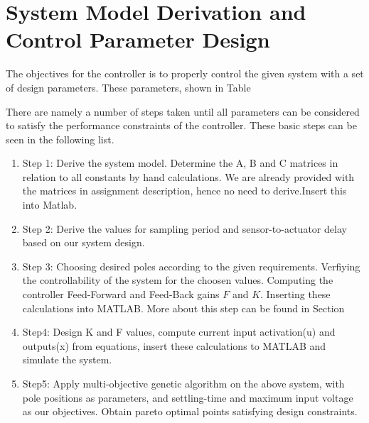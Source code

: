 \section{System Model Derivation and Control Parameter Design}
The objectives for the controller is to properly control the given system with a set of design parameters. These parameters, shown in Table %

There are namely a number of steps taken until all parameters can be considered to satisfy the performance constraints of the controller. These basic steps can be seen in the following list.

\begin{enumerate}
	\item Step 1: Derive the system model. Determine the A, B and C matrices in relation to all constants by hand calculations. We are already provided with the matrices in assignment description, hence no need to derive.Insert this into Matlab.
	 	
	\item Step 2: Derive the values for sampling period and sensor-to-actuator delay based on our system design.
	
	\item Step 3: Choosing desired poles according to the given requirements. Verfiying the controllability of the system for the choosen values. Computing the controller Feed-Forward and Feed-Back gains $F$ and $K$. Inserting these calculations into MATLAB. More about this step can be found in Section %
	
	\item Step4: Design K and F values, compute current input activation(u) and outputs(x) from equations, insert these calculations to MATLAB and simulate the system. 
	
	\item Step5: Apply multi-objective genetic algorithm on the above system, with pole positions as parameters, and settling-time and maximum input voltage as our objectives. Obtain pareto optimal points satisfying design constraints. 
\end{enumerate}



